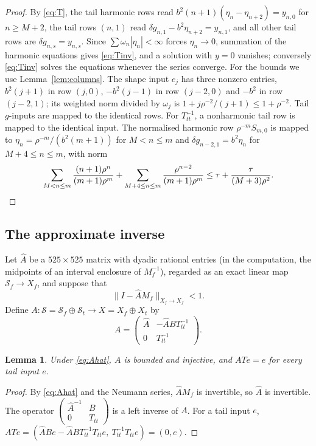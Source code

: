 \documentclass[11pt]{amsart}
\newtheorem{lemma}[theorem]{Lemma}
\theoremstyle{definition}
\theoremstyle{remark}
\numberwithin{equation}{section}
\newcommand{\Sc}{\mathcal{S}}
\newcommand{\nrm}[1]{\lVert #1\rVert}
\begin{document}
\begin{proof}
By \eqref{eq:T}, the tail harmonic rows read $b^2(n+1)(\eta_n-\eta_{n+2})=y_{n,0}$ for $n\geq M+2$, the tail rows $(n,1)$ read $\delta g_{n,1}-b^2\eta_{n+2}=y_{n,1}$, and all other tail rows are $\delta g_{n,s}=y_{n,s}$. Since $\sum\omega_n|\eta_n|<\infty$ forces $\eta_n\to0$, summation of the harmonic equations gives \eqref{eq:Tinv}, and a solution with $y=0$ vanishes; conversely \eqref{eq:Tinv} solves the equations whenever the series converge. For the bounds we use Lemma~\ref{lem:columns}. The shape input $e_j$ has three nonzero entries, $b^2(j+1)$ in row $(j,0)$, $-b^2(j-1)$ in row $(j-2,0)$ and $-b^2$ in row $(j-2,1)$; its weighted norm divided by $\omega_j$ is $1+j\rho^{-2}/(j+1)\leq1+\rho^{-2}$. Tail $g$-inputs are mapped to the identical rows. For $T_{tt}^{-1}$, a nonharmonic tail row is mapped to the identical input. The normalised harmonic row $\rho^{-m}S_{m,0}$ is mapped to $\eta_n=\rho^{-m}/(b^2(m+1))$ for $M<n\leq m$ and $\delta g_{n-2,1}=b^2\eta_n$ for $M+4\leq n\leq m$, with norm
\[
\sum_{M<n\leq m}\frac{(n+1)\rho^n}{(m+1)\rho^m}+\sum_{M+4\leq n\leq m}\frac{\rho^{n-2}}{(m+1)\rho^m}\leq\tau+\frac{\tau}{(M+3)\rho^2}. \qedhere
\]
\end{proof}

\subsection{The approximate inverse}
Let $\widehat A$ be a $525\times525$ matrix with dyadic rational entries (in the computation, the midpoints of an interval enclosure of $M_f^{-1}$), regarded as an exact linear map $\Sc_f\to X_f$, and suppose that
\begin{equation}\label{eq:Ahat}
\nrm{I-\widehat AM_f}_{X_f\to X_f}<1 .
\end{equation}
Define $A\colon\Sc=\Sc_f\oplus\Sc_t\to X=X_f\oplus X_t$ by
\begin{equation}\label{eq:A}
A=\begin{pmatrix}\widehat A&-\widehat ABT_{tt}^{-1}\\0&T_{tt}^{-1}\end{pmatrix}.
\end{equation}

\begin{lemma}\label{lem:A}
Under \eqref{eq:Ahat}, $A$ is bounded and injective, and $ATe=e$ for every tail input $e$.
\end{lemma}

\begin{proof}
By \eqref{eq:Ahat} and the Neumann series, $\widehat AM_f$ is invertible, so $\widehat A$ is invertible. The operator $\left(\begin{smallmatrix}\widehat A^{-1}&B\\0&T_{tt}\end{smallmatrix}\right)$ is a left inverse of $A$. For a tail input $e$, $ATe=(\widehat ABe-\widehat ABT_{tt}^{-1}T_{tt}e,\ T_{tt}^{-1}T_{tt}e)=(0,e)$.
\end{proof}
\end{document}

